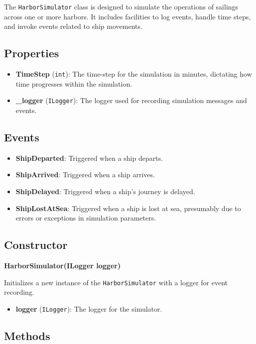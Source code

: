 \documentclass[12pt]{article}
\begin{document}
The \texttt{HarborSimulator} class is designed to simulate the operations of sailings across one or more harbors. It includes facilities to log events, handle time steps, and invoke events related to ship movements.

\subsection*{Properties}

\begin{itemize}
    \item \textbf{TimeStep} (\texttt{int}): The time-step for the simulation in minutes, dictating how time progresses within the simulation.
    \item \textbf{\_logger} (\texttt{ILogger}): The logger used for recording simulation messages and events.
\end{itemize}

\subsection*{Events}

\begin{itemize}
    \item \textbf{ShipDeparted}: Triggered when a ship departs.
    \item \textbf{ShipArrived}: Triggered when a ship arrives.
    \item \textbf{ShipDelayed}: Triggered when a ship's journey is delayed.
    \item \textbf{ShipLostAtSea}: Triggered when a ship is lost at sea, presumably due to errors or exceptions in simulation parameters.
\end{itemize}

\subsection*{Constructor}

\textbf{HarborSimulator(ILogger logger)}

Initializes a new instance of the \texttt{HarborSimulator} with a logger for event recording.

\begin{itemize}
    \item \textbf{logger} (\texttt{ILogger}): The logger for the simulator.
\end{itemize}

\subsection*{Methods}
\end{document}
